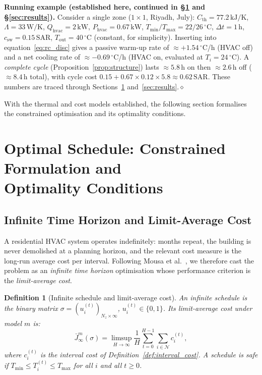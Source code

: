 \documentclass[12pt,a4paper]{article}
\let\oldsection\section
\renewcommand{\section}[1]{\FloatBarrier\oldsection{#1}}
\let\oldsubsection\subsection
\renewcommand{\subsection}[1]{\FloatBarrier\oldsubsection{#1}}
\newtheorem{definition}{Definition}
\newcommand{\sched}{\sigma}
\newcommand{\Tmin}{T_{\min}}
\newcommand{\Tmax}{T_{\max}}
\newcommand{\Tout}{T_{\mathrm{out}}}
\newcommand{\Cth}{C_{\mathrm{th}}}
\newcommand{\Qhvac}{Q_{\mathrm{hvac}}}
\newcommand{\csw}{c_{\mathrm{sw}}}
\newcommand{\Phvac}{P_{\mathrm{hvac}}}
\begin{document}
\noindent\textbf{Running example (established here, continued in §\ref{sec:schedule} and §\ref{sec:results}).}
Consider a single zone ($1\times1$, Riyadh, July): $\Cth=77.2\,\text{kJ/K}$,
$\Lambda=33\,\text{W/K}$, $\Qhvac=2\,\text{kW}$, $\Phvac=0.67\,\text{kW}$,
$\Tmin/\Tmax=22/26\,^\circ$C, $\Delta t=1\,\text{h}$, $\csw=0.15\,\text{SAR}$,
$\Tout=40\,^\circ$C (constant, for simplicity).
Inserting into equation~\eqref{eq:rc_disc} gives a passive warm-up rate of
$\approx+1.54\,^\circ$C/h (HVAC off) and a net cooling rate of $\approx-0.69\,^\circ$C/h
(HVAC on, evaluated at $T_i=24\,^\circ$C).
A \emph{complete cycle} (Proposition~\ref{prop:structure}) lasts
$\approx5.8\,\text{h}$ on then $\approx2.6\,\text{h}$ off ($\approx8.4\,\text{h}$ total),
with cycle cost $0.15+0.67\times0.12\times5.8\approx0.62\,\text{SAR}$.
These numbers are traced through Sections~\ref{sec:schedule} and~\ref{sec:results}.\hfill$\diamond$

With the thermal and cost models established, the following section
formalises the constrained optimisation and its optimality conditions.

\section{Optimal Schedule: Constrained Formulation and\\
         Optimality Conditions}
\label{sec:schedule}

\subsection{Infinite Time Horizon and Limit-Average Cost}
\label{subsec:infinite}

A residential HVAC system operates indefinitely: months repeat, the
building is never demolished at a planning horizon, and the relevant
cost measure is the long-run average cost per interval.
Following Mousa et al.~\cite{Mousa2018}, we therefore cast the problem
as an \emph{infinite time horizon} optimisation whose performance
criterion is the \emph{limit-average cost}.

\begin{definition}[Infinite schedule and limit-average cost]
\label{def:inf_schedule}
An \emph{infinite schedule} is the binary matrix
$\sched=(u_i^{(t)})_{N_z\times\infty}$, $u_i^{(t)}\in\{0,1\}$.
Its limit-average cost under model $m$ is:
\begin{equation}
  \bar{J}^m_\infty(\sched)
  = \limsup_{H\to\infty}
    \frac{1}{H}\sum_{t=0}^{H-1}\sum_{i\in\mathcal{N}} c_i^{(t)},
  \label{eq:limsup}
\end{equation}
where $c_i^{(t)}$ is the interval cost of Definition~\ref{def:interval_cost}.
A schedule is \emph{safe} if $\Tmin\le T_i^{(t)}\le\Tmax$ for all $i$
and all $t\ge0$.
\end{definition}
\end{document}
